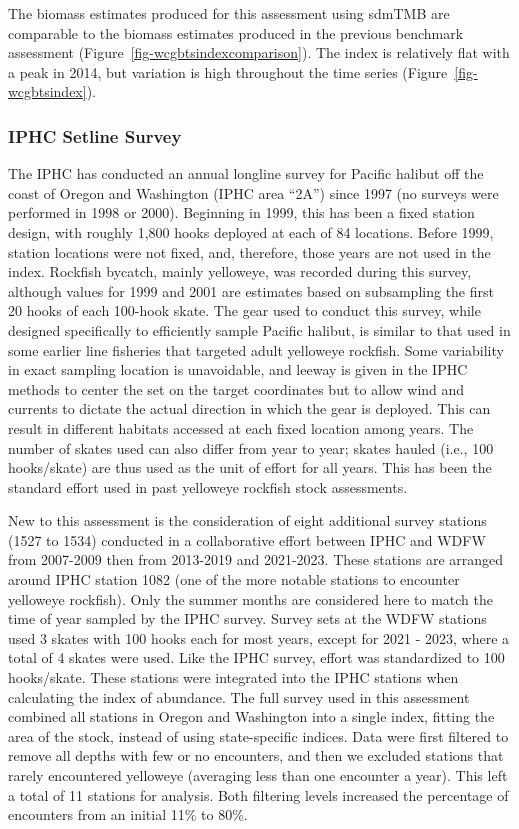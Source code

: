 \documentclass[
]{scrartcl}
\begin{document}
The biomass estimates produced for this assessment using sdmTMB are
comparable to the biomass estimates produced in the previous benchmark
assessment (Figure~\ref{fig-wcgbtsindexcomparison}). The index is
relatively flat with a peak in 2014, but variation is high throughout
the time series (Figure~\ref{fig-wcgbtsindex}).

\subsubsection{IPHC Setline Survey}\label{iphc-setline-survey}

The IPHC has conducted an annual longline survey for Pacific halibut off
the coast of Oregon and Washington (IPHC area ``2A'') since 1997 (no
surveys were performed in 1998 or 2000). Beginning in 1999, this has
been a fixed station design, with roughly 1,800 hooks deployed at each
of 84 locations. Before 1999, station locations were not fixed, and,
therefore, those years are not used in the index. Rockfish bycatch,
mainly yelloweye, was recorded during this survey, although values for
1999 and 2001 are estimates based on subsampling the first 20 hooks of
each 100-hook skate. The gear used to conduct this survey, while
designed specifically to efficiently sample Pacific halibut, is similar
to that used in some earlier line fisheries that targeted adult
yelloweye rockfish. Some variability in exact sampling location is
unavoidable, and leeway is given in the IPHC methods to center the set
on the target coordinates but to allow wind and currents to dictate the
actual direction in which the gear is deployed. This can result in
different habitats accessed at each fixed location among years. The
number of skates used can also differ from year to year; skates hauled
(i.e., 100 hooks/skate) are thus used as the unit of effort for all
years. This has been the standard effort used in past yelloweye rockfish
stock assessments.

New to this assessment is the consideration of eight additional survey
stations (1527 to 1534) conducted in a collaborative effort between IPHC
and WDFW from 2007-2009 then from 2013-2019 and 2021-2023. These
stations are arranged around IPHC station 1082 (one of the more notable
stations to encounter yelloweye rockfish). Only the summer months are
considered here to match the time of year sampled by the IPHC survey.
Survey sets at the WDFW stations used 3 skates with 100 hooks each for
most years, except for 2021 - 2023, where a total of 4 skates were used.
Like the IPHC survey, effort was standardized to 100 hooks/skate. These
stations were integrated into the IPHC stations when calculating the
index of abundance. The full survey used in this assessment combined all
stations in Oregon and Washington into a single index, fitting the area
of the stock, instead of using state-specific indices. Data were first
filtered to remove all depths with few or no encounters, and then we
excluded stations that rarely encountered yelloweye (averaging less than
one encounter a year). This left a total of 11 stations for analysis.
Both filtering levels increased the percentage of encounters from an
initial 11\% to 80\%.
\end{document}
